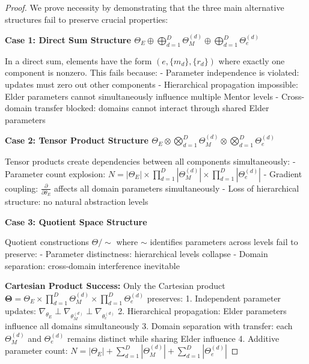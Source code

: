 \begin{proof}
We prove necessity by demonstrating that the three main alternative structures fail to preserve crucial properties:

\textbf{Case 1: Direct Sum Structure $\Theta_E \oplus \bigoplus_{d=1}^D \Theta_M^{(d)} \oplus \bigoplus_{d=1}^D \Theta_e^{(d)}$}

In a direct sum, elements have the form $(e, \{m_d\}, \{r_d\})$ where exactly one component is nonzero. This fails because:
- Parameter independence is violated: updates must zero out other components
- Hierarchical propagation impossible: Elder parameters cannot simultaneously influence multiple Mentor levels
- Cross-domain transfer blocked: domains cannot interact through shared Elder parameters

\textbf{Case 2: Tensor Product Structure $\Theta_E \otimes \bigotimes_{d=1}^D \Theta_M^{(d)} \otimes \bigotimes_{d=1}^D \Theta_e^{(d)}$}

Tensor products create dependencies between all components simultaneously:
- Parameter count explosion: $N = |\Theta_E| \times \prod_{d=1}^D |\Theta_M^{(d)}| \times \prod_{d=1}^D |\Theta_e^{(d)}|$
- Gradient coupling: $\frac{\partial}{\partial\theta_E}$ affects all domain parameters simultaneously
- Loss of hierarchical structure: no natural abstraction levels

\textbf{Case 3: Quotient Space Structure}

Quotient constructions $\Theta/\sim$ where $\sim$ identifies parameters across levels fail to preserve:
- Parameter distinctness: hierarchical levels collapse
- Domain separation: cross-domain interference inevitable

\textbf{Cartesian Product Success:}
Only the Cartesian product $\boldsymbol{\Theta} = \Theta_E \times \prod_{d=1}^D \Theta_M^{(d)} \times \prod_{d=1}^D \Theta_e^{(d)}$ preserves:
1. Independent parameter updates: $\nabla_{\theta_E} \perp \nabla_{\theta_M^{(d)}} \perp \nabla_{\theta_e^{(d)}}$
2. Hierarchical propagation: Elder parameters influence all domains simultaneously
3. Domain separation with transfer: each $\Theta_M^{(d)}$ and $\Theta_e^{(d)}$ remains distinct while sharing Elder influence
4. Additive parameter count: $N = |\Theta_E| + \sum_{d=1}^D |\Theta_M^{(d)}| + \sum_{d=1}^D |\Theta_e^{(d)}|$
\end{proof}

